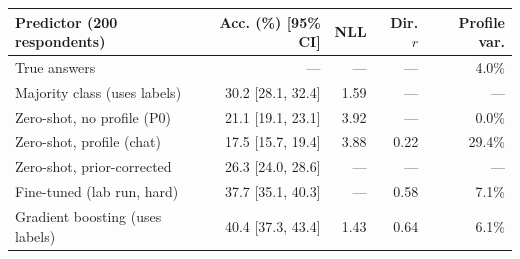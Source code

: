 \setlength{\tabcolsep}{2.6pt}
\begin{tabular}{@{}lrrrr@{}}
\toprule
\textbf{Predictor (200 respondents)} & \textbf{Acc. (\%)} [95\% CI] & \textbf{NLL} & \textbf{Dir. $r$} & \textbf{Profile var.} \\
\midrule
True answers & --- & --- & --- & 4.0\% \\
Majority class (uses labels) & 30.2 [28.1, 32.4] & 1.59 & --- & --- \\
Zero-shot, no profile (P0) & 21.1 [19.1, 23.1] & 3.92 & --- & 0.0\% \\
Zero-shot, profile (chat) & 17.5 [15.7, 19.4] & 3.88 & 0.22 & 29.4\% \\
Zero-shot, prior-corrected & 26.3 [24.0, 28.6] & --- & --- & --- \\
Fine-tuned (lab run, hard) & 37.7 [35.1, 40.3] & --- & 0.58 & 7.1\% \\
Gradient boosting (uses labels) & 40.4 [37.3, 43.4] & 1.43 & 0.64 & 6.1\% \\
\bottomrule
\end{tabular}